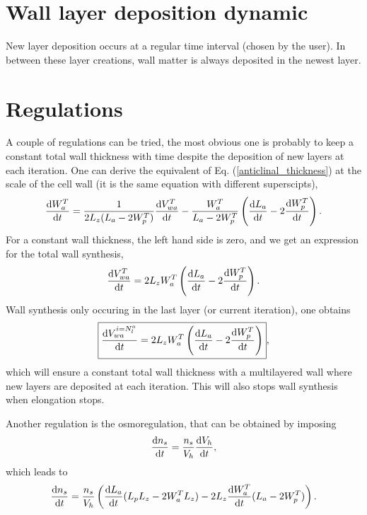 \documentclass[]{article}
\begin{document}
\section{Wall layer deposition dynamic}
New layer deposition occurs at a regular time interval (chosen by the user). In between these layer creations, wall matter is always deposited in the newest layer.

\section{Regulations}
A couple of regulations can be tried, the most obvious one is probably to keep a constant total wall thickness with time despite the deposition of new layers at each iteration. One can derive the equivalent of Eq. (\ref{anticlinal_thickness}) at the scale of the cell wall (it is the same equation with different superscipts),
\begin{equation}
		\frac{{\rm d} W_{a}^T}{{\rm d} t}=\frac{1}{2L_z(L_a-2W_p^T)}\frac{{\rm d} V_{wa}^T}{{\rm d} t}  - \frac{W_a^T}{L_a-2W_p^T}\left(\frac{{\rm d} L_a}{{\rm d} t}-2\frac{{\rm d} W_p^T}{{\rm d} t}\right).
\end{equation}
For a constant wall thickness, the left hand side is zero, and we get an expression for the total wall synthesis,
\begin{equation}
		\frac{{\rm d} V_{wa}^T}{{\rm d} t} = 2L_zW_a^T\left(\frac{{\rm d} L_a}{{\rm d} t}-2\frac{{\rm d} W_p^T}{{\rm d} t}\right).
\end{equation}
Wall synthesis only occuring in the last layer (or current iteration), one obtains
\begin{equation}
	\boxed{
	\frac{{\rm d} V_{wa}^{i=N_l^a}}{{\rm d} t} = 2L_zW_a^T\left(\frac{{\rm d} L_a}{{\rm d} t}-2\frac{{\rm d} W_p^T}{{\rm d} t}\right)},
\end{equation}
which will ensure a constant total wall thickness with a multilayered wall where new layers are deposited at each iteration. This will also stops wall synthesis when elongation stops.

Another regulation is the osmoregulation, that can be obtained by imposing
\begin{equation}
	\frac{{\rm d} n_s}{{\rm d} t} = \frac{n_s}{V_h}\frac{{\rm d} V_h}{{\rm d} t},
\end{equation}
which leads to 
\begin{equation}
	\frac{{\rm d} n_s}{{\rm d} t} = \frac{n_s}{V_h}\left(\frac{{\rm d} L_a}{{\rm d} t}(L_pL_z-2W_a^TL_z) -2L_z\frac{{\rm d} W_a^T}{{\rm d} t}(L_a-2W_p^T)\right).
\end{equation}
\end{document}
